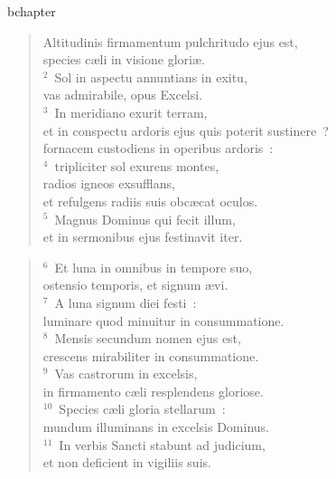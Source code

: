 bchapter\begin{verse}\vspace{-19pt}Altitudinis firmamentum pulchritudo ejus est,\\ species c\ae li in visione glori\ae .\\
${}^{2}$~Sol in aspectu annuntians in exitu,\\ vas admirabile, opus Excelsi.\\
${}^{3}$~In meridiano exurit terram,\\ et in conspectu ardoris ejus quis poterit sustinere~?\\ fornacem custodiens in operibus ardoris~:\\
${}^{4}$~tripliciter sol exurens montes,\\ radios igneos exsufflans,\\ et refulgens radiis suis obc\ae cat oculos.\\
${}^{5}$~Magnus Dominus qui fecit illum,\\ et in sermonibus ejus festinavit iter.\end{verse}


\begin{verse}${}^{6}$~Et luna in omnibus in tempore suo,\\ ostensio temporis, et signum \ae vi.\\
${}^{7}$~A luna signum diei festi~:\\ luminare quod minuitur in consummatione.\\
${}^{8}$~Mensis secundum nomen ejus est,\\ crescens mirabiliter in consummatione.\\
${}^{9}$~Vas castrorum in excelsis,\\ in firmamento c\ae li resplendens gloriose.\\
${}^{10}$~Species c\ae li gloria stellarum~:\\ mundum illuminans in excelsis Dominus.\\
${}^{11}$~In verbis Sancti stabunt ad judicium,\\ et non deficient in vigiliis suis.\end{verse}


